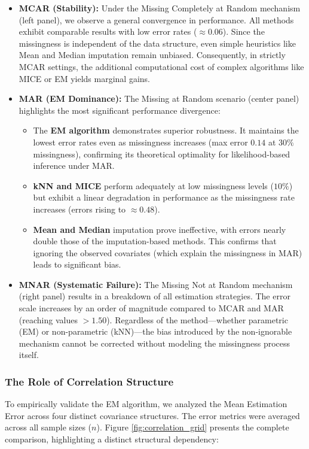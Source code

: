 \documentclass[11pt, a4paper]{article}
\begin{document}
\begin{itemize}
    \item \textbf{MCAR (Stability):} Under the Missing Completely at Random mechanism (left panel), we observe a general convergence in performance. All methods exhibit comparable results with low error rates ($\approx 0.06$). Since the missingness is independent of the data structure, even simple heuristics like Mean and Median imputation remain unbiased. Consequently, in strictly MCAR settings, the additional computational cost of complex algorithms like MICE or EM yields marginal gains.

    \item \textbf{MAR (EM Dominance):} The Missing at Random scenario (center panel) highlights the most significant performance divergence:
    \begin{itemize}
        \item The \textbf{EM algorithm} demonstrates superior robustness. It maintains the lowest error rates even as missingness increases (max error $0.14$ at $30\%$ missingness), confirming its theoretical optimality for likelihood-based inference under MAR.
        \item \textbf{kNN and MICE} perform adequately at low missingness levels ($10\%$) but exhibit a linear degradation in performance as the missingness rate increases (errors rising to $\approx 0.48$).
        \item \textbf{Mean and Median} imputation prove ineffective, with errors nearly double those of the imputation-based methods. This confirms that ignoring the observed covariates (which explain the missingness in MAR) leads to significant bias.
    \end{itemize}

    \item \textbf{MNAR (Systematic Failure):} The Missing Not at Random mechanism (right panel) results in a breakdown of all estimation strategies. The error scale increases by an order of magnitude compared to MCAR and MAR (reaching values $> 1.50$). Regardless of the method—whether parametric (EM) or non-parametric (kNN)—the bias introduced by the non-ignorable mechanism cannot be corrected without modeling the missingness process itself.
\end{itemize}

\subsubsection{The Role of Correlation Structure}
To empirically validate the EM algorithm, we analyzed the Mean Estimation Error across four distinct covariance structures. The error metrics were averaged across all sample sizes ($n$). Figure \ref{fig:correlation_grid} presents the complete comparison, highlighting a distinct structural dependency:
\end{document}
